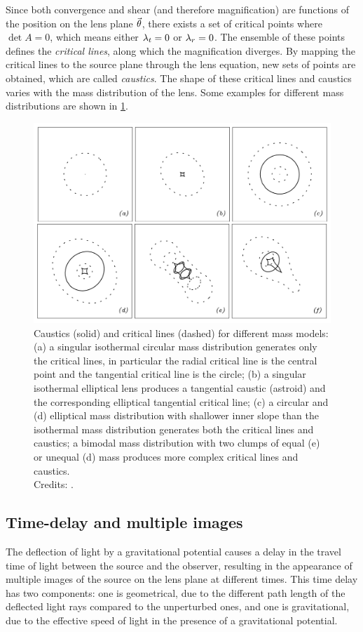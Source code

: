 Since both convergence and shear (and therefore magnification) are functions of the position on the lens plane $\va{\theta}$, there exists a set of critical points where $\det A = 0$, which means either $\lambda_t = 0$ or $\lambda_r = 0$. The ensemble of these points defines the \emph{critical lines}, along which the magnification diverges. By mapping the critical lines to the source plane through the lens equation, new sets of points are obtained, which are called \emph{caustics}.
The shape of these critical lines and caustics varies with the mass distribution of the lens. Some examples for different mass distributions are shown in \cref{fig:caustics_critlines}.

\begin{figure}
    \centering
    \includegraphics[width=0.6\linewidth, keepaspectratio]{img//chapter2/caustics_critlines.png}
    \caption[Caustics and critical lines shapes]{Caustics (solid) and critical lines (dashed) for different mass models: (a) a singular isothermal circular mass distribution generates only the critical lines, in particular the radial critical line is the central point and the tangential critical line is the circle; (b) a singular isothermal elliptical lens produces a tangential caustic (astroid) and the corresponding elliptical tangential critical line; (c) a circular and (d) elliptical mass distribution with shallower inner slope than the isothermal mass distribution generates both the critical lines and caustics; a bimodal mass distribution with two clumps of equal (e) or unequal (d) mass produces more complex critical lines and caustics.\\\small{Credits: \cite{kneib_cluster_2011}.}}
    \label{fig:caustics_critlines}
\end{figure}


\subsection{Time-delay and multiple images}
\label{subsec:time_delay_images}
The deflection of light by a gravitational potential causes a delay in the travel time of light between the source and the observer, resulting in the appearance of multiple images of the source on the lens plane at different times.
This time delay has two components: one is geometrical, due to the different path length of the deflected light rays compared to the unperturbed ones, and one is gravitational, due to the effective speed of light in the presence of a gravitational potential.

